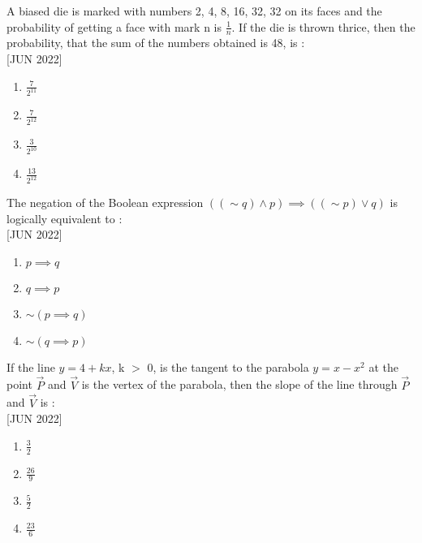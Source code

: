 \iffalse
  \title{Assignment}
  \author{ee24btech11030}
  \section{mcq-single}
\fi

\item A biased die is marked with numbers 2, 4, 8, 16, 32, 32 on its faces and the probability of getting a face with mark n is $\frac{1}{n}$. If the die is thrown thrice, then the probability, that the sum of the numbers obtained is 48, is :  \\ \hfill{[JUN 2022]}
    \begin{multicols}{4}
    \begin{enumerate}
        \item $\frac{7}{2^{11}}$
        \item $\frac{7}{2^{12}}$
        \item $\frac{3}{2^{10}}$
        \item $\frac{13}{2^{12}}$
    \end{enumerate}
    \end{multicols}
    \bigskip
    \item The negation of the Boolean expression $((\sim q) \land p) \implies ((\sim p) \lor q)$ is logically equivalent to :  \\\hfill{[JUN 2022]}
    \begin{multicols}{4}
    \begin{enumerate}
        \item $p \implies q$
        \item $q \implies p$
        \item $\sim (p \implies q)$
        \item $\sim (q \implies p)$
    \end{enumerate} 
    \end{multicols}
    \bigskip
    \item If the line $y = 4 + kx$, k $>$ 0, is the tangent to the parabola $y = x - x^2$ at the point $\vec{P}$ and $\vec{V}$ is the vertex of the parabola, then the slope of the line through $\vec{P}$ and $\vec{V}$ is :  \\\hfill{[JUN 2022]}
    \begin{multicols}{4}
    \begin{enumerate}
        \item $\frac{3}{2}$
        \item $\frac{26}{9}$
        \item $\frac{5}{2}$
        \item $\frac{23}{6}$
    \end{enumerate}
    \end{multicols}
